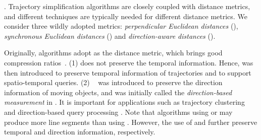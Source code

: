 . Trajectory simplification algorithms are closely coupled with distance metrics, and different techniques are typically needed for different distance metrics.  We consider three wildly adopted metrics: \emph{perpendicular Euclidean distances} (\ped), \emph{synchronous Euclidean distances} (\sed) and \emph{direction-aware distances} (\dad).


Originally, \lsa algorithms adopt \ped as the distance metric, which brings good compression ratios~\cite{Douglas:Peucker, Hershberger:Speeding, Liu:BQS, Muckell:Compression, Chen:Trajectory, Cao:Spatio, Shi:Survey}. (1) \ped does not preserve the temporal information. Hence, \sed was then introduced to preserve temporal information of trajectories and to support spatio-temporal queries\cite{Meratnia:Spatiotemporal}.
(2) \dad~\cite{Long:Direction, Zhang:Evaluation} was introduced to preserve the direction information of moving objects, and was initially called the \emph{direction-based measurement} in \cite{Long:Direction}. It is important for applications such as trajectory clustering and direction-based query processing \cite{Long:Direction,Long:Mining}.
%
Note that \lsa algorithms using \sed or \dad may produce more line segments than using \ped. However, the use of \sed and \dad further preserve temporal and direction information, respectively.



